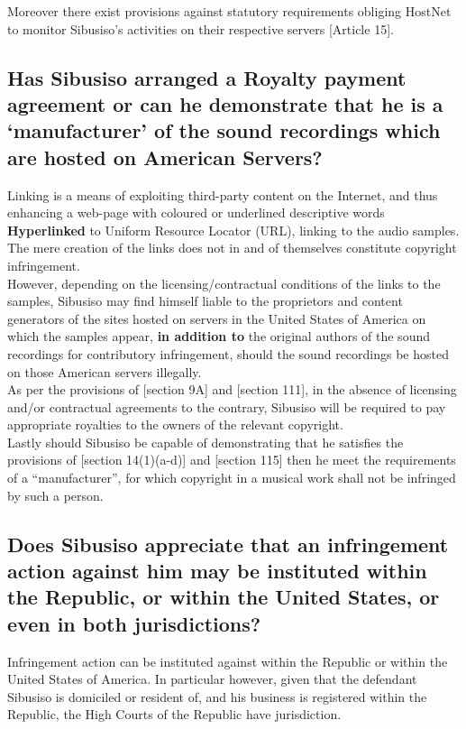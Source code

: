 \documentclass[11pt]{article}
\begin{document}
Moreover there exist provisions against statutory requirements obliging HostNet
to monitor Sibusiso's activities on their respective servers [Article 15]\cite{eurlex00_elec_commerce}.

\subsection{Has Sibusiso arranged a Royalty payment agreement or can he demonstrate that he is a `manufacturer' of the sound recordings which are hosted on American Servers?}
\label{sec:org00f106d}
Linking is a means of exploiting third-party content on the Internet, and thus
enhancing a web-page with coloured or underlined descriptive words \textbf{Hyperlinked}
to Uniform Resource Locator (URL), linking to the audio samples. The mere
creation of the links does not in and of themselves constitute copyright
infringement.\\

However, depending on the licensing/contractual conditions of the links to the
samples, Sibusiso may find himself liable to the proprietors and content
generators of the sites hosted on servers in the United States of America on
which the samples appear, \textbf{in addition to} the original authors of the sound
recordings for contributory infringement, should the sound recordings be hosted
on those American servers illegally.\\

As per the provisions of [section 9A]\cite{rsa78_copyrightact} and [section
111]\cite{usa76_title17_us_copyright_act}, in the absence of licensing and/or
contractual agreements to the contrary, Sibusiso will be required to pay
appropriate royalties to the owners of the relevant copyright.\\

Lastly should Sibusiso be capable of demonstrating that he satisfies the
provisions of [section 14(1)(a-d)]\cite{rsa78_copyrightact} and [section
115]\cite{usa76_title17_us_copyright_act} then he meet the requirements of a
``manufacturer'', for which copyright in a musical work shall not be infringed
by such a person.

\subsection{Does Sibusiso appreciate that an infringement action against him may be instituted within the Republic, or within the United States, or even in both jurisdictions?}
\label{sec:org8b30c78}
Infringement action can be instituted against within the Republic or within the
United States of America. In particular however, given that the defendant
Sibusiso is domiciled or resident of, and his business is registered within the
Republic, the High Courts of the Republic have jurisdiction.\\
\end{document}
